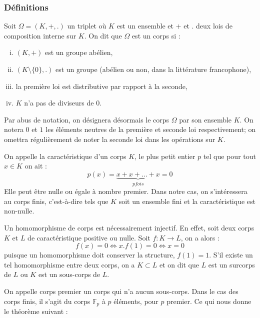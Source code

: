 \documentclass[a4paper]{article} %
\numberwithin{equation}{section}
\newcommand\GF[1]{\mathbb{F}_{#1}}
\begin{document}
\subsubsection{Définitions}

Soit $\Omega = (K, +, .)$ un triplet où $K$ est un ensemble et $+$ et $.$ deux
lois de composition interne sur $K$. On dit que $\Omega$ est un corps si : 
\begin{enumerate}[(i)]
\item $(K, +)$ est un groupe abélien,
\item $(K\setminus\lbrace0\rbrace,.)$ est un groupe (abélien ou non, dans la 
littérature francophone),
\item la première loi est distributive par rapport à la seconde,
\item $K$ n'a pas de diviseurs de $0$.
\end{enumerate}
Par abus de notation, on désignera désormais le corps $\Omega$ par son ensemble
$K$. On notera $0$ et $1$ les éléments neutres de la première et seconde loi 
respectivement; on omettra régulièrement de noter la seconde loi dans les 
opérations sur $K$.\par
On appelle la caractéristique d'un corps $K$, le plus petit entier $p$ tel que pour 
tout $x\in K$ on ait :
\[p(x) = \underbrace{x + x + \dots + x}_{p fois} = 0\]
Elle peut être nulle ou égale à nombre premier. Dans notre cas, on s'intéressera
au corps finis, c'est-à-dire tels que $K$ soit un ensemble fini et la 
caractéristique est non-nulle.\\\par
Un homomorphisme de corps est nécessairement injectif. En effet, soit deux corps 
$K$ et $L$ de caractéristique positive ou nulle. Soit $f : K \to L$, on a alors : 
\[f(x) = 0 \Leftrightarrow x.f(1) = 0 \Leftrightarrow x = 0\]
puisque un homomorphisme doit conserver la structure, $f(1) = 1$. S'il existe un
tel homomorphisme entre deux corps, on a $K\subset L$ et on dit que $L$ est un
surcorps de $L$ ou $K$ est un sous-corps de $L$.\par
On appelle corps premier un corps qui n'a aucun sous-corps. Dans le cas des
corps finis, il s'agit du corps $\GF{p}$ à $p$ éléments, pour $p$ premier. Ce
qui nous donne le théorème suivant :
\end{document}

